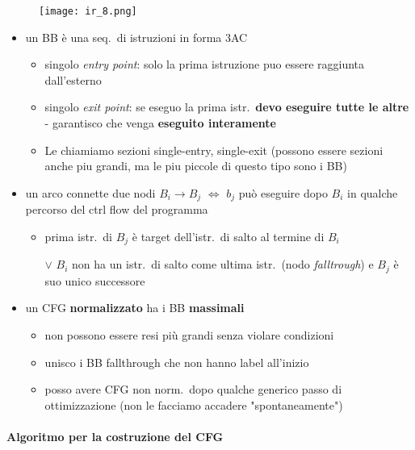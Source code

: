 {%
  \begin{wrapfigure}{r}{.325\textwidth}
    \vspace{5em}
    \hfill\texttt{[image: ir\_8.png]}
  \end{wrapfigure}
  \noindent\par \begin{itemize}
    \item un BB \`e una seq.~di istruzioni in forma 3AC
      \begin{itemize}
        \item singolo \textit{entry point}: solo la prima istruzione puo essere raggiunta dall'esterno
        \item singolo \textit{exit point}: se eseguo la prima istr.~\textbf{devo eseguire tutte le altre} - garantisco che venga \textbf{eseguito interamente}
        \item Le chiamiamo sezioni single-entry, single-exit (possono essere sezioni anche piu grandi, ma le piu piccole di questo tipo sono i BB)
      \end{itemize}
    \item un arco connette due nodi $B_{i}\rightarrow B_{j}$ $\iff$ $b_{j}$ pu\`o eseguire dopo $B_{i}$ in qualche percorso del ctrl flow del programma
      \begin{itemize}
        \item prima istr.~di $B_{j}$ \`e target dell'istr.~di salto al termine di $B_{i}$
        \item[$\lor$] $B_{i}$ non ha un istr.~di salto come ultima istr.~(nodo \textit{falltrough}) e $B_{j}$ \`e suo unico successore
      \end{itemize}
    \item un CFG \textbf{normalizzato} ha i BB \textbf{massimali}
      \begin{itemize}
        \item non possono essere resi pi\`u grandi senza violare condizioni
        \item unisco i BB fallthrough che non hanno label all'inizio
        \item posso avere CFG non norm.~dopo qualche generico passo di ottimizzazione (non le facciamo accadere "spontaneamente")
      \end{itemize}
  \end{itemize}%
}


\paragraph{Algoritmo per la costruzione del CFG}~\\

